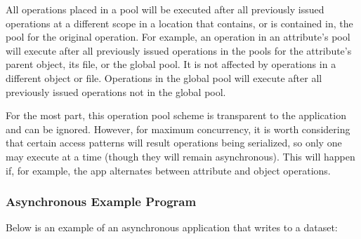\documentclass[../users_guide.tex]{subfiles}
\begin{document}
All operations placed in a pool will be executed after all previously issued
operations at a different scope in a location that contains, or is contained in,
the pool for the original operation. For example, an operation in an attribute's
pool will execute after all previously issued operations in the pools for the
attribute's parent object, its file, or the global pool. It is not affected by
operations in a different object or file. Operations in the global pool will
execute after all previously issued operations not in the global pool.

For the most part, this operation pool scheme is transparent to the application
and can be ignored. However, for maximum concurrency, it is worth considering
that certain access patterns will result operations being serialized, so only
one may execute at a time (though they will remain asynchronous). This will
happen if, for example, the app alternates between attribute and object
operations.

\subsubsection {Asynchronous Example Program}

Below is an example of an asynchronous application that writes to a dataset:
\end{document}

